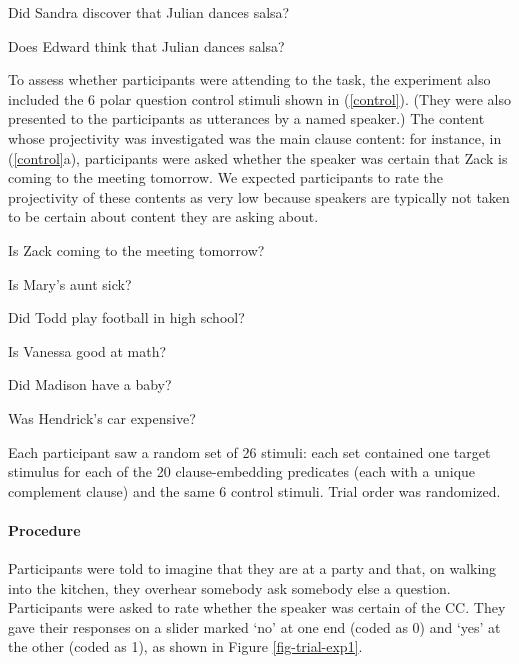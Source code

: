 \documentclass[11pt,fleqn]{article}
\newcommand{\6}{\mbox{$[\hspace*{-.6mm}[$}}
\newcommand{\9}{\mbox{$]\hspace*{-.6mm}]$}}
\begin{document}
\begin{exe}
\ex\label{stim-project} 
\begin{xlist}
 Did Sandra discover that Julian dances salsa?

 Does Edward think that Julian dances salsa?
\end{xlist}
\end{exe}

To assess whether participants were attending to the task, the experiment also included the 6  polar question control stimuli shown in (\ref{control}). (They were also presented to the participants as utterances by a named speaker.) The content whose projectivity was investigated was the main clause content: for instance, in (\ref{control}a), participants were asked whether the speaker was certain that Zack is coming to the meeting tomorrow. We expected participants to rate the projectivity of these contents as very low because speakers are typically not taken to be certain about content they are asking about.

\begin{exe}
\ex\label{control} 
\begin{xlist}

\ex   Is Zack coming to the meeting tomorrow?

\ex Is Mary's aunt sick?

\ex Did Todd play football in high school?

\ex Is Vanessa good at math?

\ex Did Madison have a baby?

\ex Was Hendrick's car expensive?

\end{xlist}
\end{exe}


Each participant saw a random set of 26 stimuli: each set contained one target stimulus for each of the 20 clause-embedding predicates (each with a unique complement clause) and the same 6 control stimuli. Trial order was randomized.

\paragraph{Procedure} Participants were told to imagine that they are at a party and that, on walking into the kitchen, they overhear somebody ask somebody else a question. Participants were asked to rate whether the speaker was certain of the CC. They gave their responses on a slider marked `no' at one end (coded as 0) and `yes' at the other (coded as 1), as shown in Figure \ref{fig-trial-exp1}.
\end{document}
